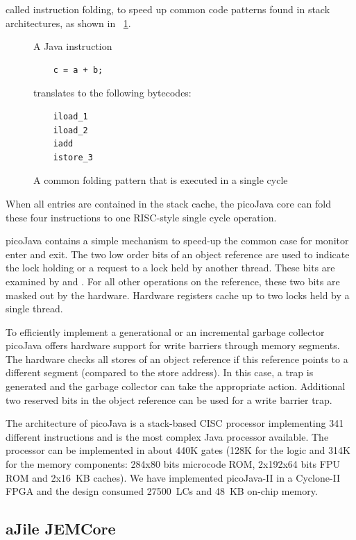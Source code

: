 called instruction folding, to speed up common code patterns found
in stack architectures, as shown in
\figurename~\ref{fig_related_folding}.
%
\begin{figure}
A Java instruction
    \begin{verbatim}
    c = a + b;
    \end{verbatim}
translates to the following bytecodes:
    \begin{verbatim}
    iload_1
    iload_2
    iadd
    istore_3
    \end{verbatim}
    \caption{A common folding pattern that is executed in a single cycle}
    \label{fig_related_folding}
\end{figure}
%
When all entries are contained in the stack cache, the picoJava core
can fold these four instructions to one RISC-style single cycle
operation.

picoJava contains a simple mechanism to speed-up the common case for
monitor enter and exit. The two low order bits of an object
reference are used to indicate the lock holding or a request to a
lock held by another thread. These bits are examined by
 and . For all other operations
on the reference, these two bits are masked out by the hardware.
Hardware registers cache up to two locks held by a single thread.

To efficiently implement a generational or an incremental garbage
collector picoJava offers hardware support for write barriers
through memory segments. The hardware checks all stores of an object
reference if this reference points to a different segment (compared
to the store address). In this case, a trap is generated and the
garbage collector can take the appropriate action. Additional two
reserved bits in the object reference can be used for a write
barrier trap.

The architecture of picoJava is a stack-based CISC processor
implementing 341 different instructions \cite{pJ1} and is the most
complex Java processor available. The processor can be implemented
\cite{Sekar2000} in about 440K gates (128K for the logic and 314K
for the memory components: 284x80 bits microcode ROM, 2x192x64 bits
FPU ROM and 2x16~KB caches). We have implemented picoJava-II in a
Cyclone-II FPGA \cite{pjfpga} and the design consumed 27500~LCs and
48~KB on-chip memory.

\subsection{aJile JEMCore}

